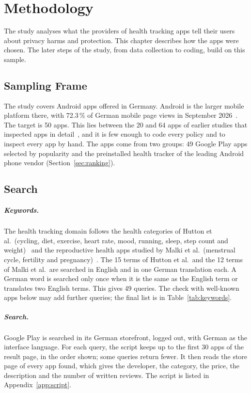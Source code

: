 \chapter{Methodology}
\label{ch:methodology}

The study analyses what the providers of health tracking apps tell their users
about privacy harms and protection. This chapter describes how the apps were
chosen. The later steps of the study, from data collection to coding, build on
this sample.

\section{Sampling Frame}
\label{sec:frame}
The study covers Android apps offered in Germany. Android is the larger mobile
platform there, with 72.3\,\% of German mobile page views in September
2026~\parencite{statcounter2026os}. The target is 50 apps. This lies between
the 20 and 64 apps of earlier studies that inspected apps in
detail~\parencite[p.~4]{malki2024exploring}\parencite[p.~5]{hutton2018assessing},
and it is few enough to code every policy and to inspect every app by hand.
The apps come from two groups: 49 Google Play apps selected by popularity and
the preinstalled health tracker of the leading Android phone vendor
(Section~\ref{sec:ranking}).

\section{Search}
\label{sec:search}
\paragraph{Keywords.} The health tracking domain follows the health categories
of Hutton et al.\ (cycling, diet, exercise, heart rate, mood, running, sleep,
step count and weight)~\parencite{hutton2018assessing} and the reproductive
health apps studied by Malki et al.\ (menstrual cycle, fertility and
pregnancy)~\parencite{malki2024exploring}. The 15 terms of Hutton et al.\ and
the 12 terms of Malki et al.\ are searched in English and in one German
translation each. A German word is searched only once when it is the same as
the English term or translates two English terms. This gives 49 queries. The
check with well-known apps below may add further queries; the final list is in
Table~\ref{tab:keywords}.

\paragraph{Search.} Google Play is searched in its German storefront, logged
out, with German as the interface language. For each query, the script keeps
up to the first 30 apps of the result page, in the order shown; some queries
return fewer. It then reads the store page of every app found, which gives the
developer, the category, the price, the description and the number of written
reviews. The script is listed in Appendix~\ref{app:script}.

